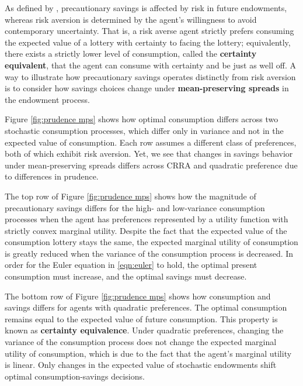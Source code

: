\documentclass[11pt]{article}
\begin{document}
As defined by \textcite{Kimball1990}, precautionary savings is affected by risk in future endowments, whereas risk aversion is determined by the agent's willingness to avoid contemporary uncertainty. That is, a risk averse agent strictly prefers consuming the expected value of a lottery with certainty to facing the lottery; equivalently, there exists a strictly lower level of consumption, called the \textbf{certainty equivalent}, that the agent can consume with certainty and be just as well off. A way to illustrate how precautionary savings operates distinctly from risk aversion is to consider how savings choices change under \textbf{mean-preserving spreads} in the endowment process.

Figure \ref{fig:prudence mps} shows how optimal consumption differs across two stochastic consumption processes, which differ only in variance and not in the expected value of consumption. Each row assumes a different class of preferences, both of which exhibit risk aversion. Yet, we see that changes in savings behavior under mean-preserving spreads differs across CRRA and quadratic preference due to differences in prudence.

The top row of Figure \ref{fig:prudence mps} shows how the magnitude of precautionary savings differs for the high- and low-variance consumption processes when the agent has preferences represented by a utility function with strictly convex marginal utility. Despite the fact that the expected value of the consumption lottery stays the same, the expected marginal utility of consumption is greatly reduced when the variance of the consumption process is decreased. In order for the Euler equation in \ref{eqn:euler} to hold, the optimal present consumption must increase, and the optimal savings must decrease.

The bottom row of Figure \ref{fig:prudence mps} shows how consumption and savings differs for agents with quadratic preferences. The optimal consumption remains equal to the expected value of future consumption.  This property is known as \textbf{certainty equivalence}. Under quadratic preferences, changing the variance of the consumption process does not change the expected marginal utility of consumption, which is due to the fact that the agent's marginal utility is linear. Only changes in the expected value of stochastic endowments shift optimal consumption-savings decisions.

\end{document}
